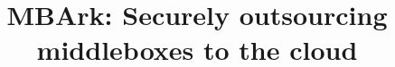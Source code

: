 \documentclass[10pt,preprint,nocopyrightspace]{sigplanconf}
\date{}
\newcommand{\sys}{MBArk\xspace}
\begin{document}
%

\title{\sys: Securely outsourcing middleboxes to the cloud}

\maketitle



























%



%

    




%
%
\balancecolumns

\end{document}
